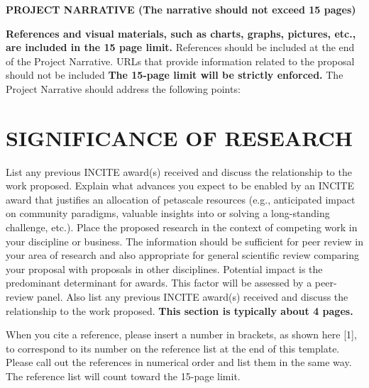 \documentclass[11pt,letterpaper,english]{article}
\begin{document}
\setlength{\parindent}{0in} %

\pagestyle{fancy}   \renewcommand{%
\headrulewidth}{0.0pt}

\begin{center}
{\bf PROJECT NARRATIVE (The narrative should not exceed 15 pages)} 
\end{center}

\vspace{-.15in}



{\bf References and visual materials, such as charts, graphs, pictures, etc., are included in the 15 page limit.} References should be included at the end of the Project Narrative. URLs that provide information related to the proposal should not be included  {\bf The 15-page limit will be strictly enforced.}  The Project Narrative should address the following points:

\vspace{-.25in}
\section{SIGNIFICANCE OF RESEARCH}
\vspace{-.2in}
List any previous INCITE award(s) received and discuss the relationship to the work proposed. Explain what advances you expect to be enabled by an INCITE award that justifies an allocation of petascale resources (e.g., anticipated impact on community paradigms, valuable insights into or solving a long-standing challenge, etc.). Place the proposed research in the context of competing work in your discipline or business. The information should be sufficient for peer review in your area of research and also appropriate for general scientific review comparing your proposal with proposals in other disciplines. Potential impact is the predominant determinant for awards. This factor will be assessed by a peer-review panel. Also list any previous INCITE award(s) received and discuss the relationship to the work proposed. {\bf This section is typically about 4 pages.}

When you cite a reference, please insert a number in brackets, as shown here [1], to correspond to its number on the reference list at the end of this template. Please call out the references in numerical order and list them in the same way. The reference list will count toward the 15-page limit.
\end{document}
